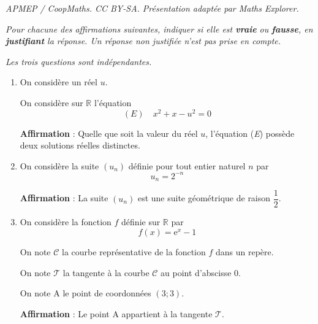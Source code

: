 \documentclass[10pt]{article}
\providecommand{\e}{{\mathrm{e}}}
\begin{document}
\noindent\textit{APMEP / CoopMaths. CC BY-SA. Présentation adaptée par Maths Explorer.}\par\medskip
\textit{Pour chacune des affirmations suivantes, indiquer si elle est \textbf{vraie} ou \textbf{fausse}, en \textbf{justifiant} la réponse. Un réponse non justifiée n'est pas prise en compte.}

\begin{center}
	\textit{Les trois questions sont indépendantes.}
\end{center}

\begin{enumerate}[itemsep=5mm]
	\item On considère un réel $u$.

	On considère sur $\mathbb{R}$ l'équation
	\[(E)\quad x^2+x-u^2=0\]

	\textbf{Affirmation} : Quelle que soit la valeur du réel $u$, l'équation (\textit{E}) possède deux solutions réelles distinctes.

	\item On considère la suite \mbox{$(u_n)$} définie pour tout entier naturel $n$ par
	\[u_n=2^{-n}\]

	\textbf{Affirmation} : La suite \mbox{$(u_n)$} est une suite géométrique de raison \mbox{$\dfrac12$}.

	\item On considère la fonction $f$ définie sur $\mathbb{R}$ par
	\[f(x)=\e^x-1\]

	On note \mbox{$\mathcal{C}$} la courbe représentative de la fonction $f$ dans un repère.

	On note \mbox{$\mathcal{T}$} la tangente à la courbe \mbox{$\mathcal{C}$} au point d'abscisse $0$.

	On note A le point de coordonnées \mbox{$(3;3)$.}

	\textbf{Affirmation} : Le point A appartient à la tangente \mbox{$\mathcal{T}$}.
\end{enumerate}
\end{document}
